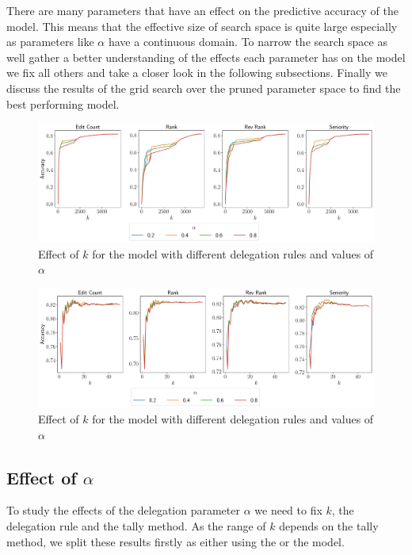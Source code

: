 There are many parameters that have an effect on the predictive accuracy of the model. This means that the effective size of search space is quite large especially as parameters like $\alpha$ have a continuous domain. To narrow the search space as well gather a better understanding of the effects each parameter has on the model we fix all others and take a closer look in the following subsections. Finally we discuss the results of the grid search over the pruned parameter space to find the best performing model.

\begin{figure}[t]
    \centering
    \includegraphics[width=\linewidth]{images/k_global.pdf}
    \caption{Effect of $k$ for the \globalv model with different delegation rules and values of $\alpha$}
    \label{fig:global-k}
\end{figure}
\begin{figure}[t]
    \centering
    \includegraphics[width=\linewidth]{images/k_local.pdf}
    \caption{Effect of $k$ for the \localv model with different delegation rules and values of $\alpha$}
    \label{fig:local-k}
\end{figure}
\subsection{Effect of $\alpha$}
To study the effects of the delegation parameter $\alpha$ we need to fix $k$, the delegation rule and the tally method. As the range of $k$ depends on the tally method, we split these results firstly as either using the \globalv or the \localv model.

